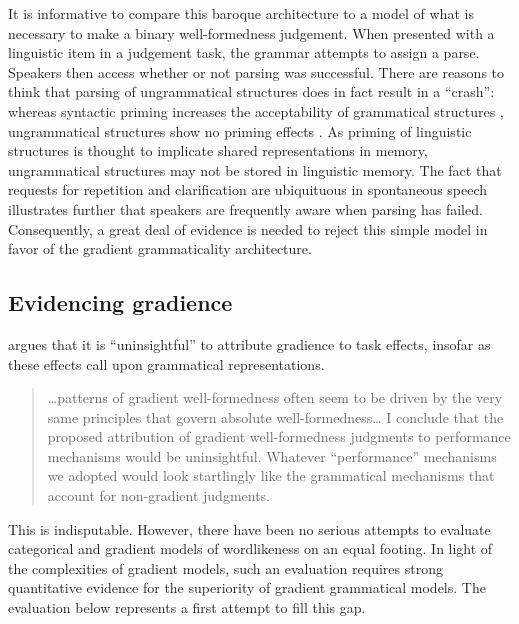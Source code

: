 It is informative to compare this baroque architecture to a model of what is necessary to make a binary well-formedness judgement. When presented with a linguistic item in a judgement task, the grammar attempts to assign a parse. Speakers then access whether or not parsing was successful. 
There are reasons to think that parsing of ungrammatical structures does in fact result in a ``crash'': whereas syntactic priming increases the acceptability of grammatical structures \citep{Luka2005}, ungrammatical structures show no priming effects \citep{Sprouse2007b}. 
As priming of linguistic structures is thought to implicate shared representations in memory, ungrammatical structures may not be stored in linguistic memory. 
The fact that requests for repetition and clarification are ubiquituous in spontaneous speech illustrates further that speakers are frequently aware when parsing has failed.
Consequently, a great deal of evidence is needed to reject this simple model in favor of the gradient grammaticality architecture. 

\subsection{Evidencing gradience}

\citet{Hayes2000} argues that it is ``uninsightful'' to attribute gradience to task effects, insofar as these effects call upon grammatical representations. 


\begin{quote}
\ldots{}patterns of gradient well-formedness often seem to be driven by the very same principles that govern absolute well-formedness\ldots{} I conclude that the proposed attribution of gradient well-formedness judgments to performance mechanisms would be uninsightful. Whatever ``performance'' mechanisms we adopted would look startlingly like the grammatical mechanisms that account for non-gradient judgments. \citep[99]{Hayes2000}
\end{quote}

\noindent
This is indisputable. 
However, there have been no serious attempts to evaluate categorical and gradient models of wordlikeness on an equal footing.
In light of the complexities of gradient models, such an evaluation requires strong quantitative evidence for the superiority of gradient grammatical models.
The evaluation below represents a first attempt to fill this gap.


